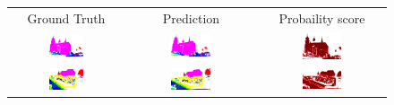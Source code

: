     \begin{figure}[h!]
        \centering
        \begin{tabular}{ccc}
            Ground Truth & Prediction & Probaility score \\
            \includegraphics[width=0.33\textwidth, height=0.18\textheight]{images/seg_output/sem3d_seg_output/1_GT.png} &
            \includegraphics[width=0.33\textwidth, height=0.18\textheight]{images/seg_output/sem3d_seg_output/1_Pred.png}& 
            \includegraphics[width=0.33\textwidth, height=0.18\textheight]{images/seg_output/sem3d_seg_output/1_max_prob.png}\\

            \includegraphics[width=0.33\textwidth, height=0.18\textheight]{images/seg_output/sem3d_seg_output/2_GT.png} &
            \includegraphics[width=0.33\textwidth, height=0.18\textheight]{images/seg_output/sem3d_seg_output/2_Pred.png}& 
            \includegraphics[width=0.33\textwidth, height=0.18\textheight]{images/seg_output/sem3d_seg_output/2_max_prob.png}\\


\end{tabular}
\end{figure}
